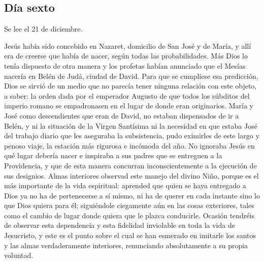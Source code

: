 \documentclass[spanish,utf8,twocolumn]{chlart}
\newenvironment{summary}{\begingroup
	\small\sffamily\itshape%
	\setlength{\leftskip}{3em}\setlength{\rightskip}{3em}\noindent
	}{\par\endgroup}
\newenvironment{lectura}{\begingroup\color{lector}}{\endgroup\par}
\begin{document}
\subsection*{Día sexto}
\begin{summary}
Se lee el 21 de diciembre.
\end{summary}
\begin{lectura}
Jesús había sido concebido en Nazaret, domicilio de San José y de María,
y allí era de creerse que había de nacer, según todas las probabilidades.
Más Dios lo tenía dispuesto de otra manera y los profetas habían
anunciado que el Mesías nacería en Belén de Judá, ciudad de David.
Para que se cumpliese esa predicción, Dios se sirvió de un medio que no
parecía tener ninguna relación con este objeto, a saber:
la orden dada por el emperador Augusto de que todos los súbditos del
imperio romano se empadronasen en el lugar de donde eran originarios.
María y José como descendientes que eran de David, no estaban
dispensados de ir a Belén, y ni la situación de la Virgen Santísima ni
la necesidad en que estaba José del trabajo diario que les aseguraba la
subsistencia, pudo eximirles de este largo y penoso viaje, la estación
más rigurosa e incómoda del año.
No ignoraba Jesús en qué lugar debería nacer e inspiraba a sus padres
que se entreguen a la Providencia, y que de esta manera concurran
inconscientemente a la ejecución de sus designios.
Almas interiores observad este manejo del divino Niño, porque es el más
importante de la vida espiritual:
aprended que quien se haya entregado a Dios ya no ha de pertenecerse a
sí mismo, ni ha de querer en cada instante sino lo que Dios quiera para
él; siguiéndole ciegamente aún en las cosas exteriores, tales como el
cambio de lugar donde quiera que le plazca conducirle.
Ocasión tendréis de observar esta dependencia y esta fidelidad
inviolable en toda la vida de Jesucristo, y este es el punto sobre el
cual se han esmerado en imitarle los santos y las almas verdaderamente
interiores, renunciando absolutamente a su propia voluntad.
\end{lectura}
\end{document}
